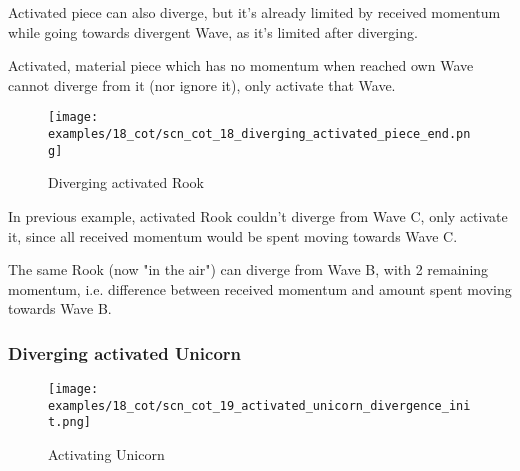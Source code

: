 \vspace*{-0.4\baselineskip}
Activated piece can also diverge, but it's already limited by received momentum while
going towards divergent Wave, as it's limited after diverging.

Activated, material piece which has no momentum when reached own Wave cannot diverge
from it (nor ignore it), only activate that Wave.

\clearpage %

\vspace*{-2.1\baselineskip}
\noindent
\begin{figure}[!h]
\texttt{[image: examples/18\_cot/scn\_cot\_18\_diverging\_activated\_piece\_end.png]}
\vspace*{-1.3\baselineskip}
\caption{Diverging activated Rook}
\label{fig:scn_cot_18_diverging_activated_piece_end}
\end{figure}

\vspace*{-0.4\baselineskip}
In previous example, activated Rook couldn't diverge from Wave C, only activate it,
since all received momentum would be spent moving towards Wave C.

The same Rook (now "in the air") can diverge from Wave B, with 2 remaining momentum,
i.e. difference between received momentum and amount spent moving towards Wave B.

\clearpage %

\subsubsection*{Diverging activated Unicorn}
\label{sec:Conquest of Tlalocan/Shaman/Divergence/Diverging activated Unicorn}

\vspace*{-1.4\baselineskip}
\noindent
\begin{figure}[!h]
\texttt{[image: examples/18\_cot/scn\_cot\_19\_activated\_unicorn\_divergence\_init.png]}
\vspace*{-1.3\baselineskip}
\caption{Activating Unicorn}
\label{fig:scn_cot_19_activated_unicorn_divergence_init}
\end{figure}

